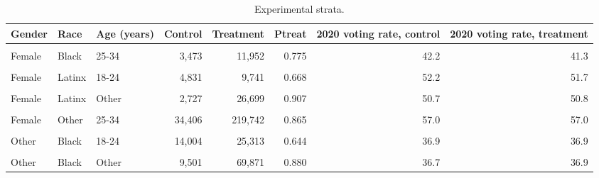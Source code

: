 \begin{table}
\centering
\caption{Experimental strata.}
\centering
\fontsize{9}{11}\selectfont
\begin{tabular}[t]{lllrrrrr}
\toprule
Gender & Race & Age (years) & Control & Treatment & Ptreat & 2020 voting rate, control & 2020 voting rate, treatment\\
\midrule
\cellcolor{gray!10}{Female} & \cellcolor{gray!10}{Black} & \cellcolor{gray!10}{18-24} & \cellcolor{gray!10}{4,508} & \cellcolor{gray!10}{7,605} & \cellcolor{gray!10}{0.628} & \cellcolor{gray!10}{48.0} & \cellcolor{gray!10}{46.4}\\
Female & Black & 25-34 & 3,473 & 11,952 & 0.775 & 42.2 & 41.3\\
\cellcolor{gray!10}{Female} & \cellcolor{gray!10}{Black} & \cellcolor{gray!10}{Other} & \cellcolor{gray!10}{4,564} & \cellcolor{gray!10}{26,783} & \cellcolor{gray!10}{0.854} & \cellcolor{gray!10}{51.4} & \cellcolor{gray!10}{51.2}\\
Female & Latinx & 18-24 & 4,831 & 9,741 & 0.668 & 52.2 & 51.7\\
\cellcolor{gray!10}{Female} & \cellcolor{gray!10}{Latinx} & \cellcolor{gray!10}{25-34} & \cellcolor{gray!10}{3,074} & \cellcolor{gray!10}{14,743} & \cellcolor{gray!10}{0.827} & \cellcolor{gray!10}{46.0} & \cellcolor{gray!10}{45.0}\\
Female & Latinx & Other & 2,727 & 26,699 & 0.907 & 50.7 & 50.8\\
\cellcolor{gray!10}{Female} & \cellcolor{gray!10}{Other} & \cellcolor{gray!10}{18-24} & \cellcolor{gray!10}{60,999} & \cellcolor{gray!10}{139,081} & \cellcolor{gray!10}{0.695} & \cellcolor{gray!10}{66.0} & \cellcolor{gray!10}{66.2}\\
Female & Other & 25-34 & 34,406 & 219,742 & 0.865 & 57.0 & 57.0\\
\cellcolor{gray!10}{Female} & \cellcolor{gray!10}{Other} & \cellcolor{gray!10}{Other} & \cellcolor{gray!10}{19,998} & \cellcolor{gray!10}{383,115} & \cellcolor{gray!10}{0.950} & \cellcolor{gray!10}{62.8} & \cellcolor{gray!10}{62.5}\\
Other & Black & 18-24 & 14,004 & 25,313 & 0.644 & 36.9 & 36.9\\
\cellcolor{gray!10}{Other} & \cellcolor{gray!10}{Black} & \cellcolor{gray!10}{25-34} & \cellcolor{gray!10}{11,122} & \cellcolor{gray!10}{44,850} & \cellcolor{gray!10}{0.801} & \cellcolor{gray!10}{27.8} & \cellcolor{gray!10}{28.1}\\
Other & Black & Other & 9,501 & 69,871 & 0.880 & 36.7 & 36.9\\

\end{tabular}
\end{table}
